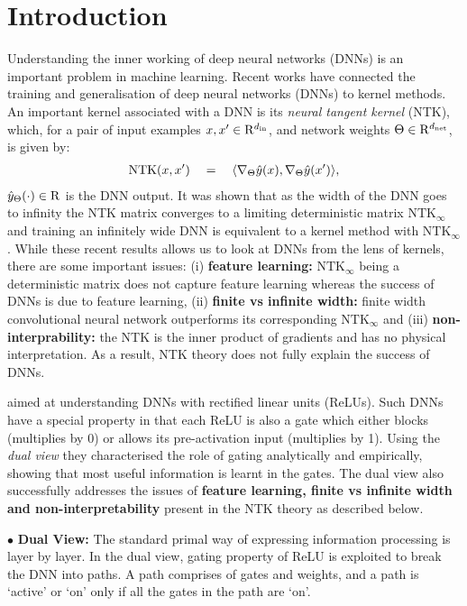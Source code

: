 \section{Introduction}
Understanding the inner working of deep neural networks (DNNs) is an important problem in machine learning. Recent works have connected the training and generalisation of deep neural networks (DNNs) to kernel methods. An important kernel associated with a DNN is its \emph{neural tangent kernel} (NTK), which, for a pair of input examples $x,x'\in\mathrm{R}^{d_{\text{in}}}$, and network weights $\Theta\in\mathrm{R}^{d_{\text{net}}}$, is given by:
\begin{align*}
 \text{NTK}(x,x')\quad = \quad \langle \nabla_{\Theta}\hat{y}(x), \nabla_{\Theta}\hat{y}(x')\rangle, 
\end{align*}
$\hat{y}_\Theta(\cdot)\in\mathrm{R}$ is the DNN output. It was shown that as the width of the DNN goes to infinity the NTK matrix converges to a limiting deterministic matrix $\text{NTK}_{\infty}$ and training an infinitely wide DNN is equivalent to a kernel method with $\text{NTK}_{\infty}$. While these recent results allows us to look at DNNs from the lens of kernels, there are some important issues: (i) \textbf{feature learning:} $\text{NTK}_{\infty}$ being a deterministic matrix does not capture feature learning whereas the success of DNNs is due to feature learning, (ii) \textbf{finite vs infinite width:} finite width convolutional neural network outperforms its corresponding $\text{NTK}_{\infty}$ and (iii)  \textbf{non-interprability:} the NTK is the inner product of gradients and has no physical interpretation. As a result, NTK theory does not fully explain the success of DNNs.

 \cite{npk} aimed at understanding DNNs with rectified linear units (ReLUs). Such DNNs have a special property in that each ReLU is also a gate which either blocks (multiplies by 0) or allows its pre-activation input (multiplies by 1). 
 Using the \emph{dual view} they characterised the role of gating analytically and empirically, showing that most useful information is learnt in the gates. The dual view also successfully addresses the issues of \textbf{feature learning, finite vs infinite width and non-interpretability} present in the NTK theory as described below.

$\bullet$ \textbf{Dual View:}  The standard primal way of expressing information processing is layer by layer.  In the dual view, gating property of ReLU is exploited to break the DNN into paths. A path comprises of gates and weights, and a path is `active' or `on' only if all the gates in the path are `on'. %

